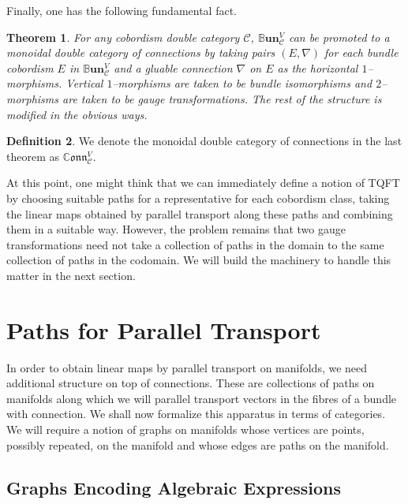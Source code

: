\documentclass{amsart}
\newcommand{\s}{\mathscr}
\newcommand{\BBun}{\mathbb{B}\textbf{un}}
\newcommand{\CConn}{\mathbb{C}\mathfrak{onn}}
\newtheorem{thm}{Theorem}
\numberwithin{thm}{section}
\theoremstyle{definition}
\newtheorem{defn}[thm]{Definition}
\begin{document}
Finally, one has the following fundamental fact.

\begin{thm}
For any cobordism double category $\s{C}$, $\BBun^V_{\s{C}}$ can be promoted to
a monoidal double category of connections by taking pairs $(E, \nabla)$ for each
bundle cobordism $E$ in $\BBun^V_{\s{C}}$ and a gluable connection $\nabla$ on
$E$ as the horizontal $1$--morphisms. Vertical $1$--morphisms are taken to be
bundle isomorphisms and $2$--morphisms are taken to be gauge transformations.
The rest of the structure is modified in the obvious ways.
\end{thm}

\begin{defn}
We denote the monoidal double category of connections in the last theorem as
$\CConn^V_{\s{C}}$.
\end{defn}

At this point, one might think that we can immediately define a notion of TQFT
by choosing suitable paths for a representative for each cobordism class,
taking the linear maps obtained by parallel transport along these paths and
combining them in a suitable way. However, the problem remains that two gauge
transformations need not take a collection of paths in the domain to the same
collection of paths in the codomain. We will build the machinery to handle this
matter in the next section.

%

\section{Paths for Parallel Transport}

In order to obtain linear maps by parallel transport on manifolds, we need
additional structure on top of connections. These are collections of paths on
manifolds along which we will parallel transport vectors in the fibres of a
bundle with connection. We shall now formalize this apparatus in terms of
categories. We will require a notion of graphs on manifolds whose vertices are
points, possibly repeated, on the manifold and whose edges are paths on the
manifold.

%

\subsection{Graphs Encoding Algebraic Expressions}\label{subsec:alg_graph_exp}
\end{document}
